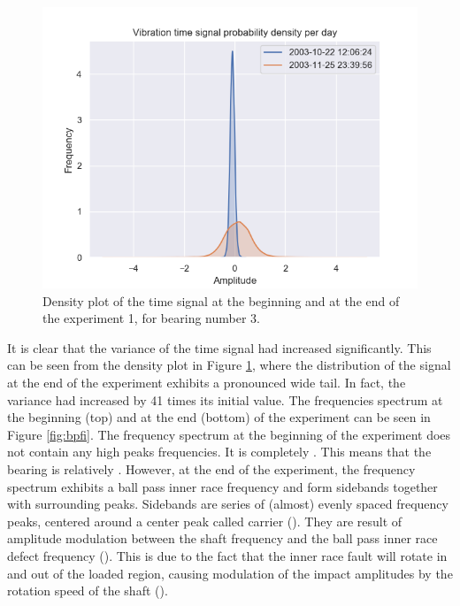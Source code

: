 \documentclass[../Main/thesis.tex]{subfiles}
\begin{document}
\begin{figure}[H]
	\centering
	\includegraphics[width=0.7\linewidth]{../fig/bpfi/bpfi_density}
	\caption{Density plot of the time signal at the beginning and at the end of the experiment 1, for bearing number 3.}
	\label{fig:bpfi_density}
\end{figure}
\justify
It is clear that the variance of the time signal had increased significantly. This can be seen from the density plot in Figure \ref{fig:bpfi_density}, where the distribution of the signal at the end of the experiment exhibits a pronounced wide tail. In fact, the variance had increased by 41 times its initial value. The frequencies spectrum at the beginning (top) and at the end (bottom) of the experiment can be seen in Figure \ref{fig:bpfi}. The frequency spectrum at the beginning of the experiment does not contain any high peaks frequencies. It is completely . This means that the bearing is relatively .
\justify
However, at the end of the experiment, the frequency spectrum exhibits a ball pass inner race frequency and form sidebands together with surrounding peaks.
Sidebands are series of (almost) evenly spaced frequency peaks, centered around a center peak called carrier (\cite{mobius2014}).
They are result of amplitude modulation between the shaft frequency and the ball pass inner race defect frequency (\cite{mobius2014}). This is due to the fact that the inner race fault will rotate in and out of the loaded region, causing modulation of the impact amplitudes by the rotation speed of the shaft (\cite{courrech}).
\end{document}
